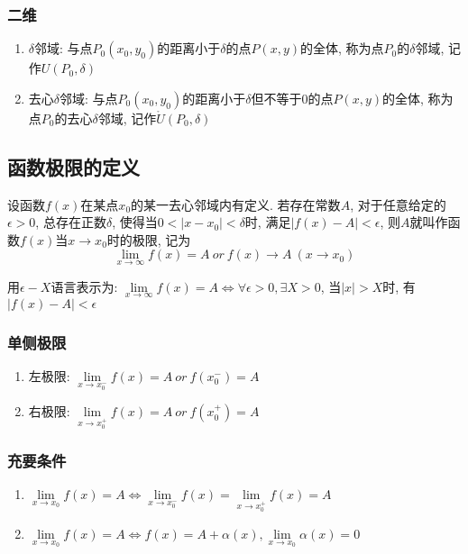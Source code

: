 \subsubsection{二维}
\begin{enumerate}
\item $ \delta $邻域: 与点$ P_{0}(x_{0},y_{0}) $的距离小于$ \delta $的点$ P(x,y) $的全体, 称为点$ P_{0} $的$ \delta $邻域, 记作$ U(P_{0},\delta) $
\item 去心$ \delta $邻域: 与点$ P_{0}(x_{0},y_{0}) $的距离小于$ \delta $但不等于0的点$ P(x,y) $的全体, 称为点$ P_{0} $的去心$ \delta $邻域, 记作$ \mathring{U}(P_{0},\delta) $
\end{enumerate}
\subsection{函数极限的定义}
设函数$ f(x) $在某点$ x_{0} $的某一去心邻域内有定义. 若存在常数$ A $, 对于任意给定的$ \epsilon >0 $, 总存在正数$ \delta $, 使得当$ 0<|x-x_{0}|<\delta $时, 满足$ |f(x)-A|<\epsilon $, 则$ A $就叫作函数$ f(x) $当$ x\rightarrow x_{0} $时的极限, 记为
\begin{equation*}
\lim\limits_{x\rightarrow \infty} f(x)=A\ or \ f(x)\rightarrow A\ (x\rightarrow x_{0})
\end{equation*}\par
用$ \epsilon -X $语言表示为: $ \lim\limits_{x\rightarrow \infty}f(x)=A\Leftrightarrow \forall \epsilon >0, \exists X>0 $, 当$ |x|>X $时, 有$ |f(x)-A|<\epsilon $
\subsubsection{单侧极限}
\begin{enumerate}
\item 左极限: $ \lim\limits_{x\rightarrow x_{0}^{-}}f(x)=A\ or\ f(x_{0}^{-})=A $
\item 右极限: $ \lim\limits_{x\rightarrow x_{0}^{+}}f(x)=A\ or\ f(x_{0}^{+})=A $
\end{enumerate}
\subsubsection{充要条件}
\begin{enumerate}
\item $ \lim\limits_{x\rightarrow x_{0}}f(x)=A\Leftrightarrow \lim\limits_{x\rightarrow x_{0}^{-}}f(x)=\lim\limits_{x\rightarrow x_{0}^{+}}f(x)=A $
\item $ \lim\limits_{x\rightarrow x_{0}}f(x)=A\Leftrightarrow f(x)=A+\alpha(x), \lim\limits_{x\rightarrow x_{0}}\alpha(x)=0 $
\end{enumerate}
